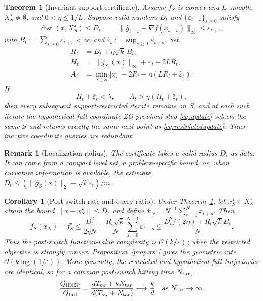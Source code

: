 \documentclass{article}
\newtheorem{theorem}{Theorem}
\newtheorem{corollary}{Corollary}
\newtheorem{remark}{Remark}
\newcommand{\dist}{\operatorname{dist}}
\newcommand{\eps}{\varepsilon}
\begin{document}
\begin{theorem}[Invariant-support certificate]\label{thm:safe}
Assume $f_S$ is convex and $L$-smooth, $X_S^\star\neq\emptyset$, and $0<\eta\le 1/L$. Suppose valid numbers $D_t$ and $\{\eps_{t+s}\}_{s\ge0}$ satisfy
\begin{equation}
 \dist(x,X_S^\star)\le D_t,\qquad
 \|\widehat g_{t+s}-\nabla f(x_{t+s})\|_\infty\le\eps_{t+s},
 \label{eq:convexbounds}
\end{equation}
with $B_t:=\sum_{s\ge0}\eps_{t+s}<\infty$ and $\bar\eps_t:=\sup_{s\ge0}\eps_{t+s}$. Set
\begin{align}
R_t&=D_t+\eta\sqrt{k}\,B_t,\nonumber\\
H_t&=\|\widehat g_{S^c}(x)\|_\infty+\eps_t+2LR_t,\nonumber\\
A_t&=\min_{i\in S}|x_i|-2R_t-\eta(LR_t+\bar\eps_t).
\label{eq:convexcertdef}
\end{align}
If
\begin{equation}
 H_t+\bar\eps_t<\lambda,\qquad
 A_t>\eta(H_t+\bar\eps_t),
 \label{eq:convexcert}
\end{equation}
then every subsequent support-restricted iterate remains on $S$, and at each such iterate the hypothetical full-coordinate ZO proximal step \eqref{eq:update} selects the same $S$ and returns exactly the same next point as \eqref{eq:restrictedupdate}. Thus inactive coordinate queries are redundant.
\end{theorem}

\begin{remark}[Localization radius]\label{rem:radius}
The certificate takes a valid radius $D_t$ as data. It can come from a compact level set, a problem-specific bound, or, when curvature information is available, the estimate $D_t\le(\|\widehat g_S(x)\|_2+\sqrt{k}\eps_t)/m$.
\end{remark}

\begin{corollary}[Post-switch rate and query ratio]\label{cor:query}
Under Theorem~\ref{thm:safe}, let $x_S^\star\in X_S^\star$ attain the bound $\|x-x_S^\star\|\le D_t$ and define $\bar x_N=N^{-1}\sum_{s=1}^{N}x_{t+s}$. Then
\begin{equation}
 f_S(\bar x_N)-f_S^\star
 \le \frac{D_t^2}{2\eta N}+\frac{R_t\sqrt{k}}{N}\sum_{s=0}^{N-1}\eps_{t+s}
 \le \frac{D_t^2/(2\eta)+R_t\sqrt{k}B_t}{N}.
 \label{eq:convexrate}
\end{equation}
Thus the post-switch function-value complexity is $\mathcal O(k/\eps)$; when the restricted objective is strongly convex, Proposition~\ref{prop:rsc} gives the geometric rate $\mathcal O(k\log(1/\eps))$. More generally, the restricted and hypothetical full trajectories are identical, so for a common post-switch hitting time $N_{\rm tar}$,
\begin{equation}
\frac{Q_{\rm IDEP}}{Q_{\rm full}}
=\frac{dT_{\rm sw}+kN_{\rm tar}}{d(T_{\rm sw}+N_{\rm tar})}
\longrightarrow \frac{k}{d}
\quad\text{as }N_{\rm tar}\to\infty.
\label{eq:ratio}
\end{equation}
\end{corollary}
\end{document}
